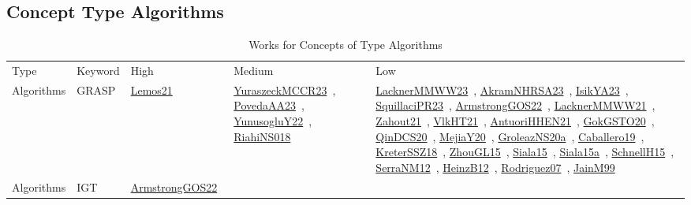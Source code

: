 \clearpage
\subsection{Concept Type Algorithms}
\label{sec:Algorithms}
{\scriptsize
\begin{longtable}{lp{3cm}>{\raggedright\arraybackslash}p{6cm}>{\raggedright\arraybackslash}p{6cm}>{\raggedright\arraybackslash}p{8cm}}
\rowcolor{white}\caption{Works for Concepts of Type Algorithms}\\ \toprule
\rowcolor{white}Type & Keyword & High & Medium & Low\\ \midrule\endhead
\bottomrule
\endfoot
Algorithms & GRASP & \href{../works/Lemos21.pdf}{Lemos21}~\cite{Lemos21} & \href{../works/YuraszeckMCCR23.pdf}{YuraszeckMCCR23}~\cite{YuraszeckMCCR23}, \href{../works/PovedaAA23.pdf}{PovedaAA23}~\cite{PovedaAA23}, \href{../works/YunusogluY22.pdf}{YunusogluY22}~\cite{YunusogluY22}, \href{../works/RiahiNS018.pdf}{RiahiNS018}~\cite{RiahiNS018} & \href{../works/LacknerMMWW23.pdf}{LacknerMMWW23}~\cite{LacknerMMWW23}, \href{../works/AkramNHRSA23.pdf}{AkramNHRSA23}~\cite{AkramNHRSA23}, \href{../works/IsikYA23.pdf}{IsikYA23}~\cite{IsikYA23}, \href{../works/SquillaciPR23.pdf}{SquillaciPR23}~\cite{SquillaciPR23}, \href{../works/ArmstrongGOS22.pdf}{ArmstrongGOS22}~\cite{ArmstrongGOS22}, \href{../works/LacknerMMWW21.pdf}{LacknerMMWW21}~\cite{LacknerMMWW21}, \href{../works/Zahout21.pdf}{Zahout21}~\cite{Zahout21}, \href{../works/VlkHT21.pdf}{VlkHT21}~\cite{VlkHT21}, \href{../works/AntuoriHHEN21.pdf}{AntuoriHHEN21}~\cite{AntuoriHHEN21}, \href{../works/GokGSTO20.pdf}{GokGSTO20}~\cite{GokGSTO20}, \href{../works/QinDCS20.pdf}{QinDCS20}~\cite{QinDCS20}, \href{../works/MejiaY20.pdf}{MejiaY20}~\cite{MejiaY20}, \href{../works/GroleazNS20a.pdf}{GroleazNS20a}~\cite{GroleazNS20a}, \href{../works/Caballero19.pdf}{Caballero19}~\cite{Caballero19}, \href{../works/KreterSSZ18.pdf}{KreterSSZ18}~\cite{KreterSSZ18}, \href{../works/ZhouGL15.pdf}{ZhouGL15}~\cite{ZhouGL15}, \href{../works/Siala15.pdf}{Siala15}~\cite{Siala15}, \href{../works/Siala15a.pdf}{Siala15a}~\cite{Siala15a}, \href{../works/SchnellH15.pdf}{SchnellH15}~\cite{SchnellH15}, \href{../works/SerraNM12.pdf}{SerraNM12}~\cite{SerraNM12}, \href{../works/HeinzB12.pdf}{HeinzB12}~\cite{HeinzB12}, \href{../works/Rodriguez07.pdf}{Rodriguez07}~\cite{Rodriguez07}, \href{../works/JainM99.pdf}{JainM99}~\cite{JainM99}\\
Algorithms & IGT & \href{../works/ArmstrongGOS22.pdf}{ArmstrongGOS22}~\cite{ArmstrongGOS22} &  & \\

\end{longtable}}
